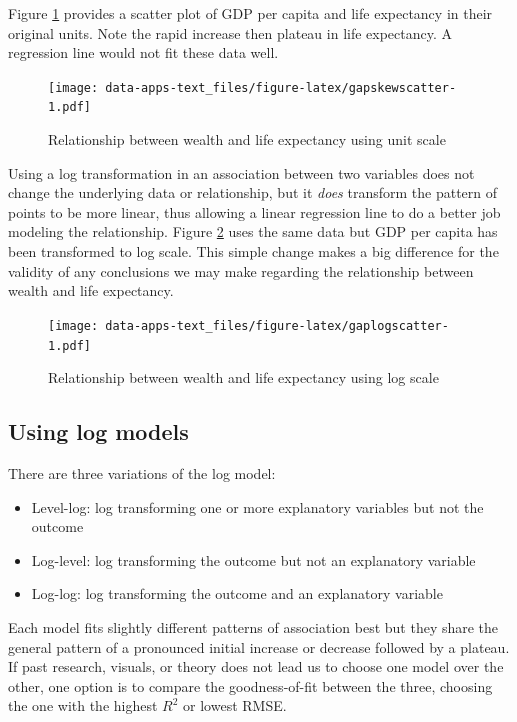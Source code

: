 \documentclass[
]{book}
\providecommand{\tightlist}{%
  \setlength{\itemsep}{0pt}\setlength{\parskip}{0pt}}
\begin{document}
Figure \ref{fig:gapskewscatter} provides a scatter plot of GDP per capita and life expectancy in their original units. Note the rapid increase then plateau in life expectancy. A regression line would not fit these data well.

\begin{figure}
\centering
\texttt{[image: data-apps-text\_files/figure-latex/gapskewscatter-1.pdf]}
\caption{\label{fig:gapskewscatter}Relationship between wealth and life expectancy using unit scale}
\end{figure}

Using a log transformation in an association between two variables does not change the underlying data or relationship, but it \emph{does} transform the pattern of points to be more linear, thus allowing a linear regression line to do a better job modeling the relationship. Figure \ref{fig:gaplogscatter} uses the same data but GDP per capita has been transformed to log scale. This simple change makes a big difference for the validity of any conclusions we may make regarding the relationship between wealth and life expectancy.

\begin{figure}
\centering
\texttt{[image: data-apps-text\_files/figure-latex/gaplogscatter-1.pdf]}
\caption{\label{fig:gaplogscatter}Relationship between wealth and life expectancy using log scale}
\end{figure}

\hypertarget{using-log-models}{%
\subsection{Using log models}\label{using-log-models}}

There are three variations of the log model:

\begin{itemize}
\tightlist
\item
  Level-log: log transforming one or more explanatory variables but not the outcome
\item
  Log-level: log transforming the outcome but not an explanatory variable
\item
  Log-log: log transforming the outcome and an explanatory variable
\end{itemize}

Each model fits slightly different patterns of association best but they share the general pattern of a pronounced initial increase or decrease followed by a plateau. If past research, visuals, or theory does not lead us to choose one model over the other, one option is to compare the goodness-of-fit between the three, choosing the one with the highest \(R^2\) or lowest RMSE.
\end{document}
